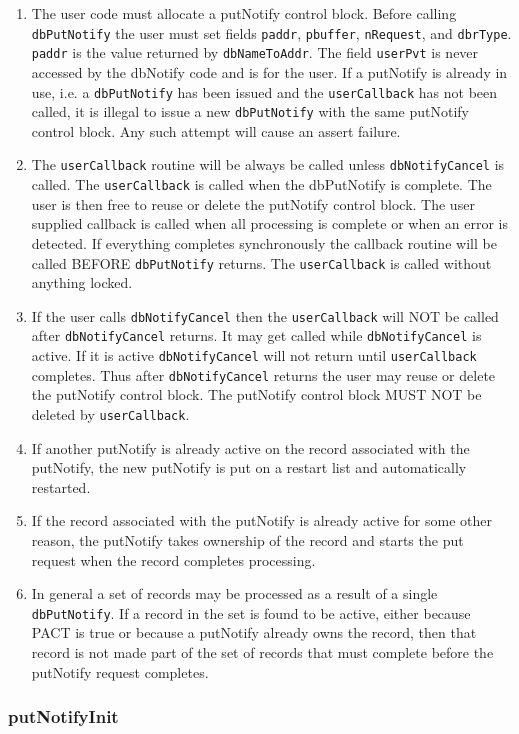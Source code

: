 \begin{enumerate}\item The user code must allocate a putNotify control block. Before calling \verb|dbPutNotify| the user must set fields 
\verb|paddr|, \verb|pbuffer|, \verb|nRequest|, and \verb|dbrType|. \verb|paddr| is the value returned by \verb|dbNameToAddr|. The field 
\verb|userPvt| is never accessed by the dbNotify code and is for the user. If a putNotify is already in use, i.e. a 
\verb|dbPutNotify| has been issued and the \verb|userCallback| has not been called, it is illegal to issue a new 
\verb|dbPutNotify| with the same putNotify control block. Any such attempt will cause an assert failure.

\item The \verb|userCallback| routine will be always be called unless \verb|dbNotifyCancel| is called. The \verb|userCallback| 
is called when the dbPutNotify is complete. The user is then free to reuse or delete the putNotify control block. The 
user supplied callback is called when all processing is complete or when an error is detected. If everything 
completes synchronously the callback routine will be called BEFORE \verb|dbPutNotify| returns. The 
\verb|userCallback| is called without anything locked.

\item If the user calls \verb|dbNotifyCancel| then the \verb|userCallback| will NOT be called after \verb|dbNotifyCancel| 
returns. It may get called while \verb|dbNotifyCancel| is active. If it is active \verb|dbNotifyCancel| will not return 
until \verb|userCallback| completes.     Thus after \verb|dbNotifyCancel| returns the user may reuse or delete the 
putNotify control block. The putNotify control block MUST NOT be deleted by \verb|userCallback|.

\item If another putNotify is already active on the record associated with the putNotify, the new putNotify is put on a 
restart list and automatically restarted.

\item If the record associated with the putNotify is already active for some other reason, the putNotify takes ownership of 
the record and starts the put request when the record completes processing.

\item In general a set of records may be processed as a result of a single \verb|dbPutNotify|. If a record in the set is found to 
be active, either because PACT is true or because a putNotify already owns the record, then that record is not made 
part of the set of records that must complete before the putNotify request completes.

\end{enumerate}\subsubsection{putNotifyInit}

